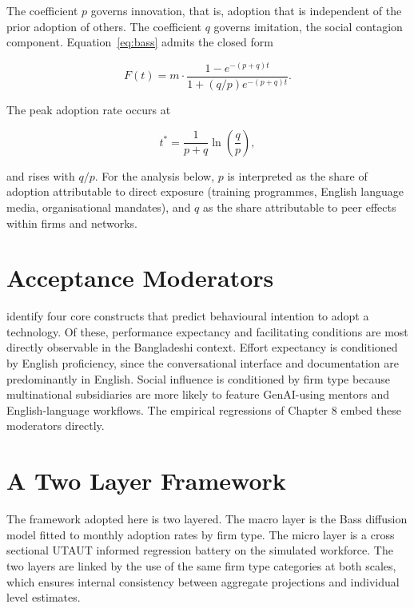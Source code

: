 \documentclass[11pt,a4paper]{report}
\begin{document}
The coefficient $p$ governs innovation, that is, adoption that is
independent of the prior adoption of others. The coefficient $q$ governs
imitation, the social contagion component. Equation~\eqref{eq:bass}
admits the closed form

\begin{equation}
F(t) = m \cdot \frac{1 - e^{-(p + q) t}}{1 + (q / p) e^{-(p + q) t}}.
\label{eq:bass-closed}
\end{equation}

The peak adoption rate occurs at

\begin{equation}
t^{\ast} = \frac{1}{p + q} \ln\left(\frac{q}{p}\right),
\end{equation}

and rises with $q / p$. For the analysis below, $p$ is interpreted as
the share of adoption attributable to direct exposure (training
programmes, English language media, organisational mandates), and $q$
as the share attributable to peer effects within firms and networks.

\section{Acceptance Moderators}

\citet{VenkateshUTAUT2003} identify four core constructs that predict
behavioural intention to adopt a technology. Of these, performance
expectancy and facilitating conditions are most directly observable in
the Bangladeshi context. Effort expectancy is conditioned by English
proficiency, since the conversational interface and documentation are
predominantly in English. Social influence is conditioned by firm type
because multinational subsidiaries are more likely to feature
GenAI-using mentors and English-language workflows. The empirical
regressions of Chapter 8 embed these moderators directly.

\section{A Two Layer Framework}

The framework adopted here is two layered. The macro layer is the Bass
diffusion model fitted to monthly adoption rates by firm type. The
micro layer is a cross sectional UTAUT informed regression battery on
the simulated workforce. The two layers are linked by the use of the
same firm type categories at both scales, which ensures internal
consistency between aggregate projections and individual level
estimates.
\end{document}
